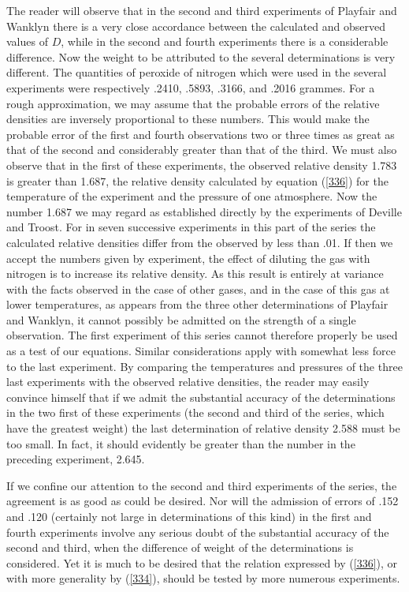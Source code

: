 \documentclass[12pt]{article}
\begin{document}
The reader will observe that in the second and third experiments of Playfair and Wanklyn there is a very close accordance between the calculated and observed values of $D$, while in the second and fourth experiments there is a considerable difference. Now the weight to be attributed to the several determinations is very different. The quantities of peroxide of nitrogen which were used in the several experiments were respectively .2410, .5893, .3166, and .2016 grammes. For a rough approximation, we may assume that the probable errors of the relative densities are inversely proportional to these numbers. This would make the probable error of the first and fourth observations two or three times as great as that of the second and considerably greater than that of the third. We must also observe that in the first of these experiments, the observed relative density 1.783 is greater than 1.687, the relative density calculated by equation (\ref{336}) for the temperature of the experiment and the pressure of one atmosphere. Now the number 1.687 we may regard as established directly by the experiments of Deville and Troost. For in seven successive experiments in this part of the series the calculated relative densities differ from the observed by less than .01. If then we accept the numbers given by experiment, the effect of diluting the gas with nitrogen is to increase its relative density. As this result is entirely at variance with the facts observed in the case of other gases, and in the case of this gas at lower temperatures, as appears from the three other determinations of Playfair and Wanklyn, it cannot possibly be admitted on the strength of a single observation. The first experiment of this series cannot therefore properly be used as a test of our equations. Similar considerations apply with somewhat less force to the last experiment. By comparing the temperatures and pressures of the three last experiments with the observed relative densities, the reader may easily convince himself that if we admit the substantial accuracy of the determinations in the two first of these experiments (the second and third of the series, which have the greatest weight) the last determination of relative density 2.588 must be too small. In fact, it should evidently be greater than the number in the preceding experiment, 2.645.

If we confine our attention to the second and third experiments of the series, the agreement is as good as could be desired. Nor will the admission of errors of .152 and .120 (certainly not large in determinations of this kind) in the first and fourth experiments involve any serious doubt of the substantial accuracy of the second and third, when the difference of weight of the determinations is considered. Yet it is much to be desired that the relation expressed by (\ref{336}), or with more generality by (\ref{334}), should be tested by more numerous experiments.
\end{document}
